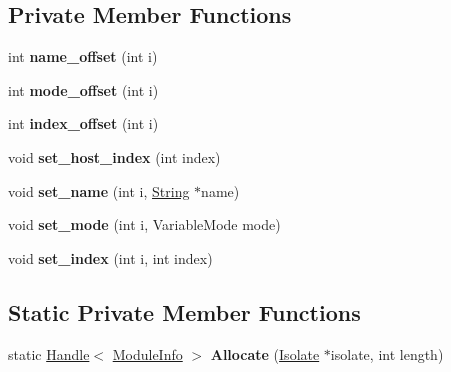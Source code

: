 \subsection*{Private Member Functions}
\begin{DoxyCompactItemize}
\item 
int {\bfseries name\+\_\+offset} (int i)\hypertarget{classv8_1_1internal_1_1_module_info_a1e98bb7624a9b67163d5d12e141ae3f2}{}\label{classv8_1_1internal_1_1_module_info_a1e98bb7624a9b67163d5d12e141ae3f2}

\item 
int {\bfseries mode\+\_\+offset} (int i)\hypertarget{classv8_1_1internal_1_1_module_info_a6c08cc229ed1621df2b58193aea8a2e2}{}\label{classv8_1_1internal_1_1_module_info_a6c08cc229ed1621df2b58193aea8a2e2}

\item 
int {\bfseries index\+\_\+offset} (int i)\hypertarget{classv8_1_1internal_1_1_module_info_a2c795d72eedc3ad0ad8938d85af4a05e}{}\label{classv8_1_1internal_1_1_module_info_a2c795d72eedc3ad0ad8938d85af4a05e}

\item 
void {\bfseries set\+\_\+host\+\_\+index} (int index)\hypertarget{classv8_1_1internal_1_1_module_info_ad96176ba61987a6c751d051509ec7b11}{}\label{classv8_1_1internal_1_1_module_info_ad96176ba61987a6c751d051509ec7b11}

\item 
void {\bfseries set\+\_\+name} (int i, \hyperlink{classv8_1_1internal_1_1_string}{String} $\ast$name)\hypertarget{classv8_1_1internal_1_1_module_info_a5696810f26a86f4b6f8a87bcca828d77}{}\label{classv8_1_1internal_1_1_module_info_a5696810f26a86f4b6f8a87bcca828d77}

\item 
void {\bfseries set\+\_\+mode} (int i, Variable\+Mode mode)\hypertarget{classv8_1_1internal_1_1_module_info_a36653a6ed8ccd902fc3c0db0e9d33a27}{}\label{classv8_1_1internal_1_1_module_info_a36653a6ed8ccd902fc3c0db0e9d33a27}

\item 
void {\bfseries set\+\_\+index} (int i, int index)\hypertarget{classv8_1_1internal_1_1_module_info_ad964b68393b9578a32eefb6f8d077078}{}\label{classv8_1_1internal_1_1_module_info_ad964b68393b9578a32eefb6f8d077078}

\end{DoxyCompactItemize}
\subsection*{Static Private Member Functions}
\begin{DoxyCompactItemize}
\item 
static \hyperlink{classv8_1_1internal_1_1_handle}{Handle}$<$ \hyperlink{classv8_1_1internal_1_1_module_info}{Module\+Info} $>$ {\bfseries Allocate} (\hyperlink{classv8_1_1internal_1_1_isolate}{Isolate} $\ast$isolate, int length)\hypertarget{classv8_1_1internal_1_1_module_info_aefba9903e96cf4f37d2f07a68bebd302}{}\label{classv8_1_1internal_1_1_module_info_aefba9903e96cf4f37d2f07a68bebd302}

\end{DoxyCompactItemize}

